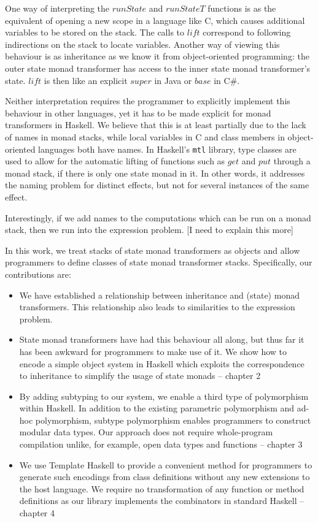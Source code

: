 One way of interpreting the $\mathit{runState}$ and $\mathit{runStateT}$ functions is as the equivalent of opening a new scope in a language like C, which causes additional variables to be stored on the stack. The calls to $\mathit{lift}$ correspond to following indirections on the stack to locate variables. Another way of viewing this behaviour is as inheritance as we know it from object-oriented programming: the outer state monad transformer has access to the inner state monad transformer's state. $\mathit{lift}$ is then like an explicit $\mathit{super}$ in Java or $\mathit{base}$ in C\#.

Neither interpretation requires the programmer to explicitly implement this behaviour in other languages, yet it has to be made explicit for monad transformers in Haskell. We believe that this is at least partially due to the lack of names in monad stacks, while local variables in C and class members in object-oriented languages both have names. In Haskell's \texttt{mtl} library, type classes are used to allow for the automatic lifting of functions such as $\mathit{get}$ and $\mathit{put}$ through a monad stack, if there is only one state monad in it. In other words, it addresses the naming problem for distinct effects, but not for several instances of the same effect.

Interestingly, if we add names to the computations which can be run on a monad stack, then we run into the expression problem. [I need to explain this more]

In this work, we treat stacks of state monad transformers as objects and allow programmers to define classes of state monad transformer stacks. Specifically, our contributions are:
\begin{itemize}
    \item We have established a relationship between inheritance and (state) monad transformers. This relationship also leads to similarities to the expression problem.
    \item State monad transformers have had this behaviour all along, but thus far it has been awkward for programmers to make use of it. We show how to encode a simple object system in Haskell which exploits the correspondence to inheritance to simplify the usage of state monads -- chapter 2
    \item By adding subtyping to our system, we enable a third type of polymorphism within Haskell. In addition to the existing parametric polymorphism and ad-hoc polymorphism, subtype polymorphism enables programmers to construct modular data types. Our approach does not require whole-program compilation unlike, for example, open data types and functions \cite{loh2006open} -- chapter 3
    \item We use Template Haskell to provide a convenient method for programmers to generate such encodings from class definitions without any new extensions to the host language. We require no transformation of any function or method definitions as our library implements the combinators in standard Haskell -- chapter 4
\end{itemize}

